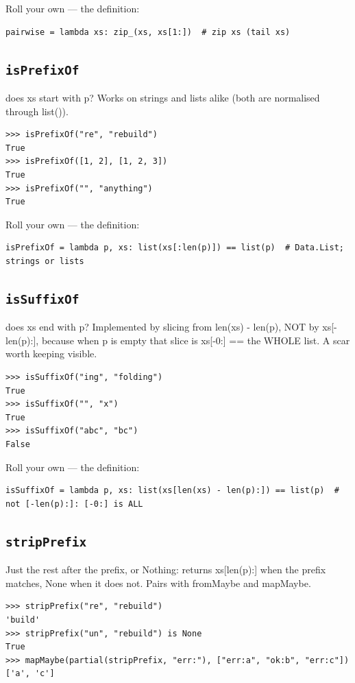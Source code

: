 \documentclass[10pt,letterpaper]{book}
\begin{document}
Roll your own --- the definition:

\begin{lstlisting}[style=ex]
pairwise = lambda xs: zip_(xs, xs[1:])  # zip xs (tail xs)
\end{lstlisting}

\subsection{\texttt{isPrefixOf}}\label{def:isPrefixOf}
does xs start with p? Works on strings and lists alike (both are normalised through list()).
\begin{lstlisting}[style=ex]
>>> isPrefixOf("re", "rebuild")
True
>>> isPrefixOf([1, 2], [1, 2, 3])
True
>>> isPrefixOf("", "anything")
True
\end{lstlisting}

Roll your own --- the definition:

\begin{lstlisting}[style=ex]
isPrefixOf = lambda p, xs: list(xs[:len(p)]) == list(p)  # Data.List; strings or lists
\end{lstlisting}
\subsection{\texttt{isSuffixOf}}\label{def:isSuffixOf}
does xs end with p? Implemented by slicing from len(xs) - len(p), NOT by xs[-len(p):], because when p is empty that slice is xs[-0:] == the WHOLE list. A scar worth keeping visible.
\begin{lstlisting}[style=ex]
>>> isSuffixOf("ing", "folding")
True
>>> isSuffixOf("", "x")
True
>>> isSuffixOf("abc", "bc")
False
\end{lstlisting}

Roll your own --- the definition:

\begin{lstlisting}[style=ex]
isSuffixOf = lambda p, xs: list(xs[len(xs) - len(p):]) == list(p)  # not [-len(p):]: [-0:] is ALL
\end{lstlisting}
\subsection{\texttt{stripPrefix}}\label{def:stripPrefix}
Just the rest after the prefix, or Nothing: returns xs[len(p):] when the prefix matches, None when it does not. Pairs with fromMaybe and mapMaybe.
\begin{lstlisting}[style=ex]
>>> stripPrefix("re", "rebuild")
'build'
>>> stripPrefix("un", "rebuild") is None
True
>>> mapMaybe(partial(stripPrefix, "err:"), ["err:a", "ok:b", "err:c"])
['a', 'c']
\end{lstlisting}
\end{document}
